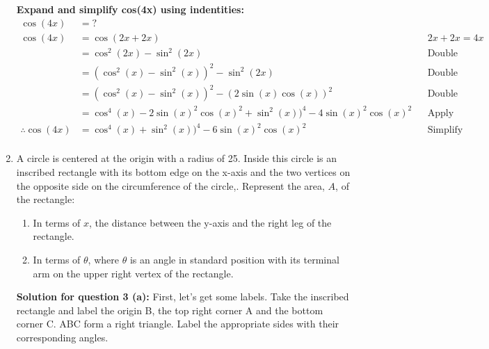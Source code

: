 \documentclass[12pt]{book}
\begin{document}
\begin{enumerate}
\textbf{Expand and simplify cos(4x) using indentities:}
\begin{align*}
    \cos(4x) &= ? \\
    \cos(4x) &= \cos(2x+2x) && 2x+2x=4x \\
    &= \cos^2(2x) - \sin^2(2x) && \text{Double Angle Identity for cosine where angle is 4x}\\
    &= (\cos^2(x) - \sin^2(x))^2 - \sin^2(2x) && \text{Double Angle Identity for cosine where angle is 2x}\\
    &= (\cos^2(x) - \sin^2(x))^2 - (2\sin(x)\cos(x))^2 && \text{Double Angle Identity for sine where angle is 2x}\\
    &= \cos^4(x) - 2\sin(x)^2\cos(x)^2 + \sin^2(x))^4 - 4\sin(x)^2\cos(x)^2 && \text{Apply exponents}\\
    \therefore \cos(4x) &= \boxed{\cos^4(x) + \sin^2(x))^4 - 6\sin(x)^2\cos(x)^2} && \text{Simplify}\\
\end{align*}

\newpage

\item A circle is centered at the origin with a radius of 25. Inside this circle is an inscribed rectangle with its bottom edge on the x-axis and the two vertices on the opposite side on the circumference of the circle,. Represent the area, $A$, of the rectangle:

\begin{enumerate}
\item In terms of $x$, the distance between the y-axis and the right leg of the rectangle. 
\item In terms of $\theta$, where $\theta$ is an angle in standard position with its terminal arm on the upper right vertex of the rectangle.
\end{enumerate}




\vspace{0.5cm}
\textbf{Solution for question 3 (a):}
\vspace{0.3cm}
First, let's get some labels. Take the inscribed rectangle and 
label the origin B, the top right corner A and the bottom corner C.
ABC form a right triangle. Label the appropriate sides 
with their corresponding angles.


\end{enumerate}
\end{document}
